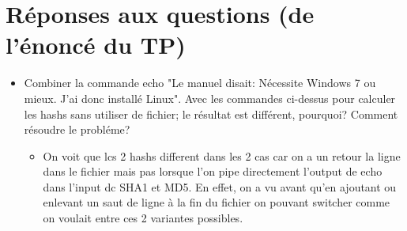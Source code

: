 %
\section{Réponses aux questions (de l'énoncé du TP)}
\begin{frame}{\secname}
%

\begin{itemize}
    \item Combiner la commande echo "Le manuel disait: Nécessite Windows 7 ou mieux. J'ai donc
installé Linux". Avec les commandes ci-dessus pour calculer les hashs sans utiliser de fichier;
le résultat est différent, pourquoi? Comment résoudre le probléme? \\
    \vspace{0.3cm}

    \begin{itemize}
        \item  On voit que lcs 2 hashs different dans les 2 cas car on a un retour la ligne dans le fichier mais pas
        lorsque l'on pipe directement l'output de echo dans l'input dc SHA1 et MD5.
        En effet, on a vu avant qu'en ajoutant ou enlevant un saut de ligne à la fin du fichier  on
        pouvant switcher comme on voulait entre ces 2 variantes possibles.
    \end{itemize}
   
\end{itemize}

\end{frame}
